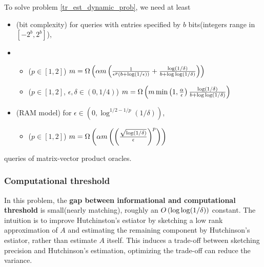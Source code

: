 \begin{cor}
\label{tr_est_dynamic}
To solve problem \ref{tr_est_dynamic_prob}, we need at least
\begin{itemize}
    \item (bit complexity) for queries with entries specified by $b$ bits(integers range in $[-2^b,2^b]$),
    \item \begin{itemize}
        \item ($p\in[1,2]$) $m=\Omega\left(\alpha m\left(\frac{1}{\epsilon^p(b+\log(1/\epsilon))}+\frac{\log(1/\delta)}{b+\log\log(1/\delta)}\right)\right)$ 
        \item ($p\in[1,2]$, $\epsilon,\delta\in(0,1/4)$) $m=\Omega\left(m\min\left(1,\frac{\alpha}{\epsilon}\right)\frac{\log(1/\delta)}{b+\log\log(1/\delta)}\right)$
    \end{itemize}
    \item (RAM model) for $\epsilon\in(0,\log^{1/2-1/p}(1/\delta))$,
    \begin{itemize}
        \item ($p\in[1,2]$) $m=\Omega\left(\alpha m\left(\left(\frac{\sqrt{\log(1/\delta)}}{\epsilon}\right)^p\right)\right)$
    \end{itemize}   
\end{itemize}
queries of matrix-vector product oracles.
\end{cor}

\subsubsection{Computational threshold}
In this problem, the \textbf{gap between informational and computational threshold} is small(nearly matching), roughly an $O\left(\log\log(1/\delta)\right)$ constant.
The intuition is to improve Hutchinston's estiator by sketching a low rank approximation of $A$ and estimating the remaining component by Hutchinson’s estiator, rather than estimate $A$ itself. 
This induces a trade-off between sketching precision and Hutchinson’s estimation, optimizing the trade-off can reduce the variance.

